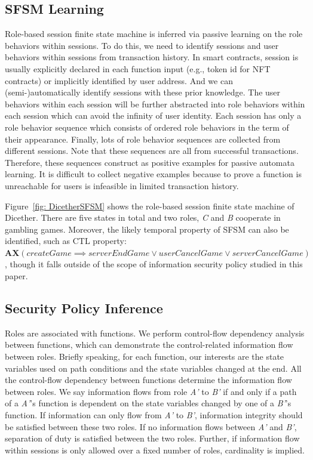 \subsection{SFSM Learning}

Role-based session finite state machine is inferred via passive learning on the role behaviors within sessions.
To do this, we need to identify sessions and user behaviors within sessions from transaction history.
In smart contracts, session is usually explicitly declared in each function input (e.g., token id for NFT contracts) or implicitly identified by user address.
And we can (semi-)automatically identify sessions with these prior knowledge.
The user behaviors within each session will be further abstracted into role behaviors within each session which can avoid the infinity of user identity.
Each session has only a role behavior sequence which consists of ordered role behaviors in the term of their appearance.
Finally, lots of role behavior sequences are collected from different sessions.
Note that these sequences are all from successful transactions.
Therefore, these sequences construct as positive examples for passive automata learning.
It is difficult to collect negative examples because to prove a function is unreachable for users is infeasible in limited transaction history.

Figure~\ref{fig: DicetherSFSM} shows the role-based session finite state machine of Dicether.
There are five states in total and two roles, \textit{C} and \textit{B} cooperate in gambling games. 
Moreover, the likely temporal property of SFSM can also be identified, such as CTL property: $\textbf{AX}(createGame \implies serverEndGame \lor userCancelGame \lor serverCancelGame)$, though it falls outside of the scope of information security policy studied in this paper.


\subsection{Security Policy Inference}
\label{subsec: informationanlysis}
Roles are associated with functions.
We perform control-flow dependency analysis between functions, which can demonstrate the control-related information flow between roles.
Briefly speaking, for each function, our interests are the state variables used on path conditions and the state variables changed at the end.
All the control-flow dependency between functions determine the information flow between roles.
We say information flows from role \textit{A'} to \textit{B'} if and only if a path of a \textit{A'}'s function is dependent on the state variables changed by one of a \textit{B'}'s function.
If information can only flow from \textit{A'} to \textit{B'}, information integrity should be satisfied between these two roles.
If no information flows between \textit{A'} and \textit{B'}, separation of duty is satisfied between the two roles.
Further, if information flow within sessions is only allowed over a fixed number of roles, cardinality is implied.

